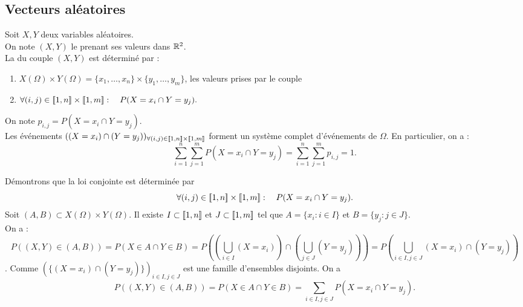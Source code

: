 \documentclass{book}
\begin{document}
\subsection{Vecteurs aléatoires}
\begin{DefinitionProposition}
Soit $X,Y$ deux variables aléatoires.\\
On note  $(X,Y)$ le  prenant ses valeurs dans $\mathbb{R}^2$.\\
La  du couple $(X,Y)$ est déterminé par  :
\begin{enumerate}
\item $X(\Omega)\times Y(\Omega)=\{x_1,\dots,x_n\}\times \{y_1,\dots,y_m\} $, les valeurs prises par le couple
\item $\forall (i,j)\in  \mathopen\lbrack\!\lbrack1,n \mathclose\rbrack\!\rbrack\times \mathopen\lbrack\!\lbrack1,m \mathclose\rbrack\!\rbrack:\quad P(X=x_i\cap Y=y_j).$
\end{enumerate}
On note $p_{i,j}=P(X=x_i\cap Y=y_j)$.\\
Les événements $((X=x_i)\cap (Y=y_j))_{\forall (i,j)\in \mathopen\lbrack\!\lbrack1,n \mathclose\rbrack\!\rbrack\times \mathopen\lbrack\!\lbrack1,m \mathclose\rbrack\!\rbrack}$ forment un système complet d'événements de $\Omega$. En particulier, on a : 
$$\sum_{i=1}^n \sum_{j=1}^mP(X=x_i\cap Y=y_j)=\sum_{i=1}^n \sum_{j=1}^m p_{i,j}=1.$$ 
\end{DefinitionProposition}
\begin{Demonstration}
Démontrons que la loi conjointe est déterminée par $$\forall (i,j)\in  \mathopen\lbrack\!\lbrack1,n \mathclose\rbrack\!\rbrack\times \mathopen\lbrack\!\lbrack1,m \mathclose\rbrack\!\rbrack:\quad P(X=x_i\cap Y=y_j).$$
Soit $(A,B)\subset X(\Omega)\times Y(\Omega)$. Il existe $I\subset\mathopen\lbrack\!\lbrack1,n \mathclose\rbrack\!\rbrack$ et $J\subset\mathopen\lbrack\!\lbrack1,m \mathclose\rbrack\!\rbrack$ tel que $A=\{x_i:i\in I\}$ et $B=\{y_j:j\in J\}$.\\ On a :
$$P((X,Y)\in (A,B))= P( X\in A\cap Y\in B )= P\left(\left(\bigcup_{i\in I} (X=x_i)\right)\cap  \left(\bigcup_{j\in J} (Y=y_j)\right)\right)=P(\bigcup_{i\in I,j\in J} (X=x_i)\cap (Y=y_j) )$$.
Comme  $(\{(X=x_i)\cap (Y=y_j)\})_{i\in I,j\in J }$ est une famille d'ensembles  disjoints. On a 
$$P((X,Y)\in (A,B))= P( X\in A\cap Y\in B )= \sum_{i\in I,j\in J}P(X=x_i\cap Y=y_j).$$   
\end{Demonstration}
\end{document}
